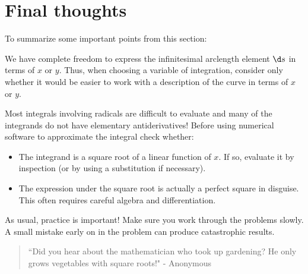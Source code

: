 \documentclass{ximera}
\begin{document}
\section{Final thoughts}
To summarize some important points from this section:


\begin{fact}
We have complete freedom to express the infinitesimal arclength element $\d s$ in terms of $x$ or $y$.  Thus, when choosing a variable of integration, consider only whether it would be easier to work with a description of the curve in terms of $x$ or $y$.\end{fact}

\begin{fact}
Most integrals involving radicals are difficult to evaluate and many of the integrands do not have elementary antiderivatives!  Before using numerical software to approximate the integral check whether:

\begin{itemize}
\item The integrand is a square root of a linear function of $x$.  If so, evaluate it by inspection (or by using a substitution if necessary).
\item The expression under the square root is actually a perfect square in disguise.  This often requires careful algebra and differentiation.
\end{itemize}
\end{fact}

As usual, practice is important!  Make sure you work through the problems slowly.  A small mistake early on in the problem can produce catastrophic results.

\begin{quote}
``Did you hear about the mathematician who took up gardening?  He only grows vegetables with square roots!" - Anonymous
\end{quote}
\end{document}
